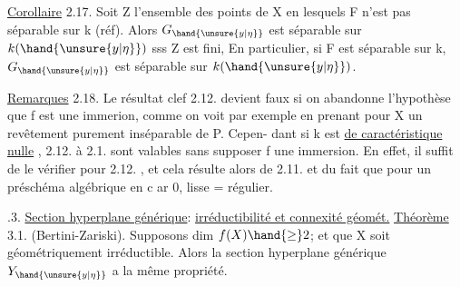 
\uline{Corollaire} 2.17.   Soit Z l'ensemble des points de X en lesquels F
n'est pas séparable sur k (réf). Alors  $G_{\hand{\unsure{y|\eta}}}$ est séparable sur $k(\hand{\unsure{y|\eta}})$ sss
Z est fini, En particulier, si F est séparable sur k, $G_{\hand{\unsure{y|\eta}}}$ est séparable
sur $k(\hand{\unsure{y|\eta}})$.

\uline{Remarques} 2.18.  Le résultat clef  2.12.  devient faux si on abandonne
l'hypothèse que f est une immerion, comme  on voit par exemple en
prenant pour  X un revêtement purement inséparable de P.   Cepen-%
dant 
  si  k est \uline{de caractéristique nulle} ,  2.12. à
2.1. sont valables sans supposer f une immersion.  En effet, il suffit
de le vérifier pour 2.12. , et  cela résulte alors de 2.11. et du fait
que  pour un préschéma algébrique en c ar 0,  lisse = régulier.


.3.   \uline{Section hyperplane générique}: \uline{irréductibilité et connexité géomét.}
\uline{Théorème} 3.1. (Bertini-Zariski).  Supposons dim $f(X) \hand{\geq} 2$; et que X
soit  géométriquement irréductible. Alors
la section hyperplane générique $Y_{\hand{\unsure{y|\eta}}}$ a la même propriété.

